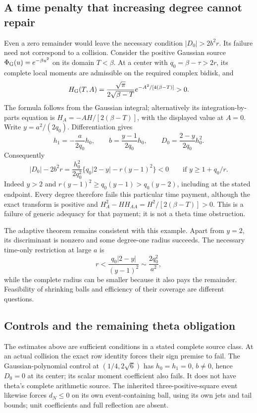 \documentclass[11pt]{article}
\numberwithin{equation}{section}
\begin{document}
\subsection{A time penalty that increasing degree cannot repair}

Even a zero remainder would leave the necessary condition
$|D_0|>2b^2r$. Its failure need not correspond to a collision.
Consider the positive Gaussian source
$\Phi_{\rm G}(u)=e^{-\beta u^2}$ on its domain $T<\beta$.
At a center with $q_0=\beta-\tau>2r$, its complete local moments
are admissible on the required complex bidisk, and
\[
 H_{\rm G}(T,A)=\frac{\sqrt\pi}{2\sqrt{\beta-T}}
                 e^{-A^2/[4(\beta-T)]}>0.
\]
The formula follows from the Gaussian integral; alternatively its
integration-by-parts equation is
$H_A=-A H/[2(\beta-T)]$, with the displayed value at $A=0$.
Write $y=a^2/(2q_0)$. Differentiation gives
\[
 h_1=-\frac{a}{2q_0}h_0,\qquad
 b=\frac{y-1}{2q_0}h_0,\qquad
 D_0=\frac{2-y}{2q_0}h_0^2.
\]
Consequently
\begin{equation}\label{fcg:gaussiantime}
 |D_0|-2b^2r=
 \frac{h_0^2}{2q_0^2}\{q_0|2-y|-r(y-1)^2\}<0
 \qquad\text{if }y\ge1+q_0/r.
\end{equation}
Indeed $y>2$ and
$r(y-1)^2\ge q_0(y-1)>q_0(y-2)$, including at the stated endpoint.
Every degree therefore fails this particular time payment, although
the exact transform is positive and
$H_A^2-HH_{AA}=H^2/[2(\beta-T)]>0$.
This is a failure of generic adequacy for that payment; it is not a
theta time obstruction.

The adaptive theorem remains consistent with this example. Apart
from $y=2$, its discriminant is nonzero and some degree-one radius
succeeds. The necessary time-only restriction at large $a$ is
\[
 r<\frac{q_0|2-y|}{(y-1)^2}\sim\frac{2q_0^2}{a^2},
\]
while the complete radius can be smaller because it also pays the
remainder. Feasibility of shrinking balls and efficiency of their
coverage are different questions.

\subsection{Controls and the remaining theta obligation}

The estimates above are sufficient conditions in a stated complete
source class. At an actual collision the exact row identity forces
their sign premise to fail. The Gaussian-polynomial control at
$(1/4,2\sqrt6)$ has $h_0=h_1=0$, $b\ne0$, hence $D_0=0$ at
its center; its scalar moment coefficient also fails. It does not
have theta's complete arithmetic source. The inherited
three-positive-square event likewise forces $d_N\le0$ on its own
event-containing ball, using its own jets and tail bounds; unit
coefficients and full reflection are absent.
\end{document}
